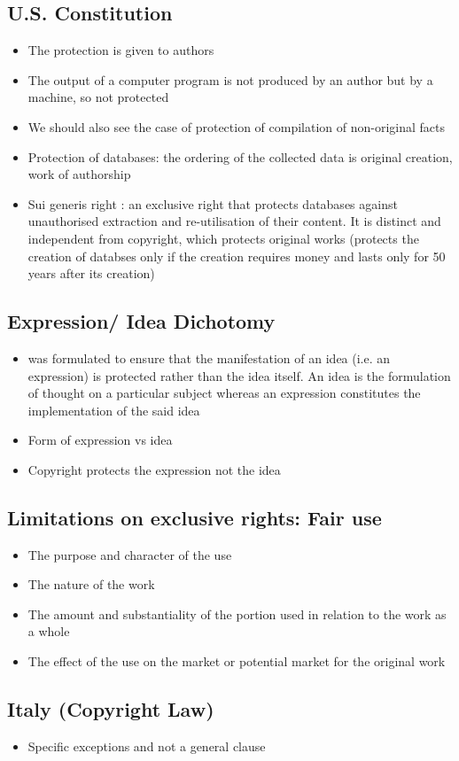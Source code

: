 \documentclass{article}
\begin{document}
\subsection{U.S. Constitution} 
\begin{itemize}
\item The protection is given to authors 
\item The output of a computer program is not produced by an author but by a machine, so not protected 
\item We should also see the case of protection of compilation of non-original facts
\item Protection of databases: the ordering of the collected data is original creation, work of authorship
\item Sui generis right : an exclusive right that protects databases against unauthorised extraction and re-utilisation of their content. It is distinct and independent from copyright, which protects original works (protects the creation of databses only if the creation requires money and lasts only for 50 years after its creation)
\end{itemize}

\subsection{Expression/ Idea Dichotomy}
\begin{itemize}
\item was formulated to ensure that the manifestation of an idea (i.e. an expression) is protected rather than the idea itself. An idea is the formulation of thought on a particular subject whereas an expression constitutes the implementation of the said idea
\item Form of expression vs idea 
\item Copyright protects the expression not the idea 
\end{itemize}


\subsection{Limitations on exclusive rights: Fair use}
\begin{itemize}
\item The purpose and character of the use
\item The nature of the work
\item The amount and substantiality of the portion used in relation to the work as a whole
\item The effect of the use on the market or potential market for the original work
\end{itemize}

\subsection{Italy (Copyright Law)}
\begin{itemize}
\item Specific exceptions and not a general clause 
\end{itemize}
\end{document}
